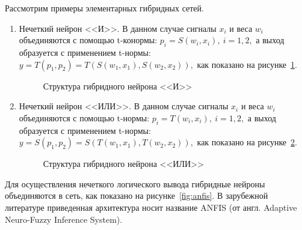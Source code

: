 Рассмотрим примеры элементарных гибридных сетей.
\begin{enumerate}
\item Нечеткий нейрон <<И>>.
  В данном случае сигналы \( x_i \) и веса \( w_i \) объединяются с помощью t-конормы:
  \( p_i = S(w_i, x_i), \: i = 1, 2, \)
  а выход образуется с применением t-нормы:
  \( y = T(p_1, p_2) = T(S(w_1, x_1), S(w_2, x_2)), \)
  как показано на рисунке~\ref{fig:hybrid_and}.

  \begin{figure}[h!]
    \centering
    \caption{Структура гибридного нейрона <<И>>}
    \label{fig:hybrid_and}
  \end{figure}

\item Нечеткий нейрон <<ИЛИ>>.
  В данном случае сигналы \( x_i \) и веса \( w_i \) объединяются с помощью t-нормы:
  \( p_i = T(w_i, x_i), \: i = 1, 2, \)
  а выход образуется с применением t-нормы:
  \( y = S(p_1, p_2) = S(T(w_1, x_1), T(w_2, x_2)), \)
  как показано на рисунке~\ref{fig:hybrid_or}.

  \begin{figure}[h!]
    \centering
    \caption{Структура гибридного нейрона <<ИЛИ>>}
    \label{fig:hybrid_or}
  \end{figure}
\end{enumerate}

Для осуществления нечеткого логического вывода
гибридные нейроны объединяются в сеть, как показано на рисунке~\ref{fig:anfis}.
В зарубежной литературе приведенная архитектура носит название ANFIS
(от англ. Adaptive Neuro-Fuzzy Inference System).

